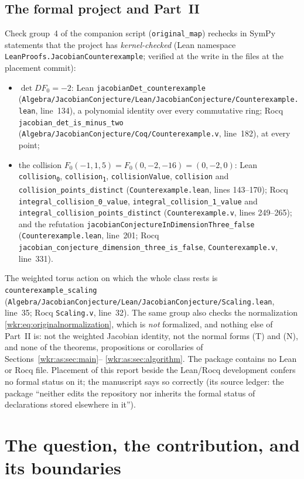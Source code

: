 \documentclass[11pt,a4paper]{article}
\numberwithin{equation}{section}
\theoremstyle{definition}
\theoremstyle{remark}
\newcommand{\rpath}[1]{\nolinkurl{#1}}
\begin{document}
\subsection{The formal project and Part~II}\label{wkr:as:sec:formal}
Check group~4 of the companion script (\texttt{original\_map}) rechecks in
SymPy statements that the project has \emph{kernel-checked} (Lean
namespace \texttt{LeanProofs.JacobianCounterexample}; verified at the
write in the files at the placement commit):
\begin{itemize}
\item $\det DF_0=-2$: Lean \texttt{jacobianDet\_counterexample}
(\rpath{Algebra/JacobianConjecture/Lean/JacobianConjecture/Counterexample.lean},
line~134), a polynomial identity over every commutative ring; Rocq
\texttt{jacobian\_det\_is\_minus\_two}
(\rpath{Algebra/JacobianConjecture/Coq/Counterexample.v}, line~182), at
every point;
\item the collision $F_0(-1,1,5)=F_0(0,-2,-16)=(0,-2,0)$: Lean
\texttt{collision\textsubscript{0}}, \texttt{collision\textsubscript{1}},
\texttt{collisionValue}, \texttt{collision} and
\texttt{collision\_points\_distinct} (\rpath{Counterexample.lean}, lines
143--170); Rocq \texttt{integral\_collision\_0\_value},
\texttt{integral\_collision\_1\_value} and
\texttt{integral\_collision\_points\_distinct} (\rpath{Counterexample.v},
lines 249--265); and the refutation
\texttt{jacobianConjectureInDimensionThree\_false}
(\rpath{Counterexample.lean}, line~201; Rocq
\texttt{jacobian\_conjecture\_dimension\_three\_is\_false},
\rpath{Counterexample.v}, line~331).
\end{itemize}
The weighted torus action on which the whole class rests is
\texttt{counterexample\_scaling}
(\rpath{Algebra/JacobianConjecture/Lean/JacobianConjecture/Scaling.lean},
line~35; Rocq \rpath{Scaling.v}, line~32). The same group also checks the
normalization \eqref{wkr:eq:originalnormalization}, which is \emph{not}
formalized, and nothing else of Part~II is: not the weighted Jacobian
identity, not the normal forms (T) and (N), and none of the theorems,
propositions or corollaries of Sections~\ref{wkr:as:sec:main}--%
\ref{wkr:as:sec:algorithm}. The package contains no Lean or Rocq file.
Placement of this report beside the Lean/Rocq development confers no
formal status on it; the manuscript says so correctly (its source ledger:
the package ``neither edits the repository nor inherits the formal status
of declarations stored elsewhere in it'').
\section{The question, the contribution, and its boundaries}
\label{wkr:as:sec:intro}
\end{document}
